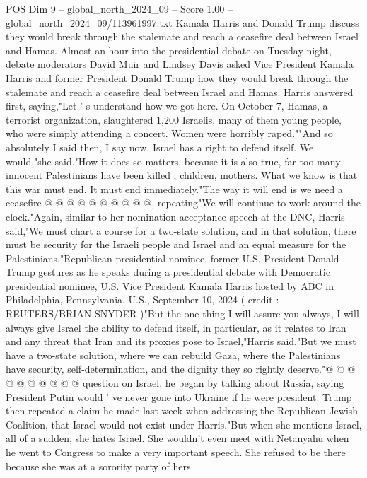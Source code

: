 \begin{textsample}{POS Dim 9 – global\_north\_2024\_09 – Score 1.00 – global\_north\_2024\_09/113961997.txt}  \label{ex:f9_pos_241}
Kamala Harris and Donald Trump discuss they would break through the stalemate and reach a ceasefire deal between Israel and Hamas.
Almost an hour into the presidential debate on Tuesday night, debate moderators David Muir and Lindsey Davis asked Vice President Kamala Harris and former President Donald Trump how they would break through the stalemate and reach a ceasefire deal between Israel and Hamas.
Harris answered first, saying,"Let ' s understand how we got here.
On October 7, Hamas, a terrorist organization, slaughtered 1,200 Israelis, many of them young people, who were simply attending a concert.
Women were horribly raped.""And so absolutely I said then, I say now, Israel has a right to defend itself.
We would,"she said."How it does so matters, because it is also true, far too many innocent Palestinians have been killed ; children, mothers.
What we know is that this war must end.
It must end immediately."The way it will end is we need a ceasefire @ @ @ @ @ @ @ @ @ @, repeating"We will continue to work around the clock."Again, similar to her nomination acceptance speech at the DNC, Harris said,"We must chart a course for a two-state solution, and in that solution, there must be security for the Israeli people and Israel and an equal measure for the Palestinians."Republican presidential nominee, former U.S.
President Donald Trump gestures as he speaks during a presidential debate with Democratic presidential nominee, U.S.
Vice President Kamala Harris hosted by ABC in Philadelphia, Pennsylvania, U.S., September 10, 2024 ( credit : REUTERS/BRIAN SNYDER )"But the one thing I will assure you always, I will always give Israel the ability to defend itself, in particular, as it relates to Iran and any threat that Iran and its proxies pose to Israel,"Harris said."But we must have a two-state solution, where we can rebuild Gaza, where the Palestinians have security, self-determination, and the dignity they so rightly deserve."@ @ @ @ @ @ @ @ @ @ question on Israel, he began by talking about Russia, saying President Putin would ' ve never gone into Ukraine if he were president.
Trump then repeated a claim he made last week when addressing the Republican Jewish Coalition, that Israel would not exist under Harris."But when she mentions Israel, all of a sudden, she hates Israel.
She wouldn't even meet with Netanyahu when he went to Congress to make a very important speech.
She refused to be there because she was at a sorority party of hers.

\end{textsample}
